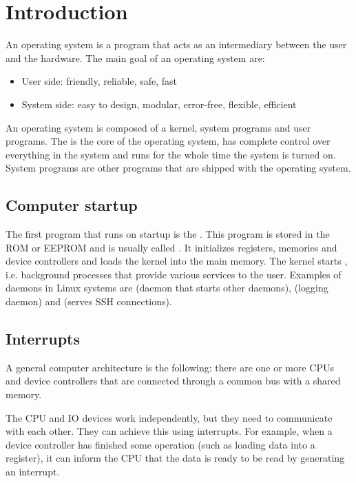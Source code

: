 \chapter{Introduction}

An operating system is a program that acts as an intermediary between the user and the hardware. The main goal of an operating system are:
\begin{itemize}
    \item User side: friendly, reliable, safe, fast
    \item System side: easy to design, modular, error-free, flexible, efficient
\end{itemize}

An operating system is composed of a kernel, system programs and user programs. The  is the core of the operating system, has complete control over everything in the system and runs for the whole time the system is turned on. System programs are other programs that are shipped with the operating system.

\section{Computer startup}

The first program that runs on startup is the . This program is stored in the ROM or EEPROM and is usually called
. It initializes registers, memories and device controllers and loads the kernel into the main memory. The kernel starts , i.e. background processes that provide various services to the user. Examples of daemons in Linux systems are  (daemon that starts other daemons),  (logging daemon) and  (serves SSH connections).

\section{Interrupts}

A general computer architecture is the following: there are one or more CPUs and device controllers that are connected through a common bus with a shared memory.


The CPU and IO devices work independently, but they need to communicate with
each other. They can achieve this using interrupts. For example, when a device
controller has finished some operation (such as loading data into a register),
it can inform the CPU that the data is ready to be read by generating an
interrupt.

